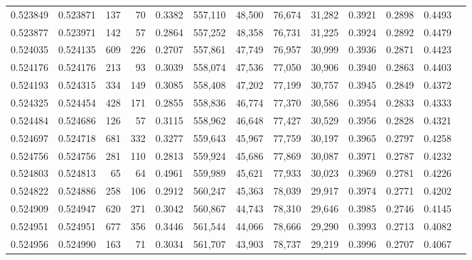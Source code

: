 \begin{tabular}{rrrrrrrrrrrrr}
0.523849 & 0.523871 &   137 &    70 &                                     0.3382 & 557,110 &  48,500 &  76,674 &  31,282 & 0.3921 & 0.2898 & 0.4493 \\
0.523877 & 0.523971 &   142 &    57 &                                     0.2864 & 557,252 &  48,358 &  76,731 &  31,225 & 0.3924 & 0.2892 & 0.4479 \\
0.524035 & 0.524135 &   609 &   226 &                                     0.2707 & 557,861 &  47,749 &  76,957 &  30,999 & 0.3936 & 0.2871 & 0.4423 \\
0.524176 & 0.524176 &   213 &    93 &                                     0.3039 & 558,074 &  47,536 &  77,050 &  30,906 & 0.3940 & 0.2863 & 0.4403 \\
0.524193 & 0.524315 &   334 &   149 &                                     0.3085 & 558,408 &  47,202 &  77,199 &  30,757 & 0.3945 & 0.2849 & 0.4372 \\
0.524325 & 0.524454 &   428 &   171 &                                     0.2855 & 558,836 &  46,774 &  77,370 &  30,586 & 0.3954 & 0.2833 & 0.4333 \\
0.524484 & 0.524686 &   126 &    57 &                                     0.3115 & 558,962 &  46,648 &  77,427 &  30,529 & 0.3956 & 0.2828 & 0.4321 \\
0.524697 & 0.524718 &   681 &   332 &                                     0.3277 & 559,643 &  45,967 &  77,759 &  30,197 & 0.3965 & 0.2797 & 0.4258 \\
0.524756 & 0.524756 &   281 &   110 &                                     0.2813 & 559,924 &  45,686 &  77,869 &  30,087 & 0.3971 & 0.2787 & 0.4232 \\
0.524803 & 0.524813 &    65 &    64 &                                     0.4961 & 559,989 &  45,621 &  77,933 &  30,023 & 0.3969 & 0.2781 & 0.4226 \\
0.524822 & 0.524886 &   258 &   106 &                                     0.2912 & 560,247 &  45,363 &  78,039 &  29,917 & 0.3974 & 0.2771 & 0.4202 \\
0.524909 & 0.524947 &   620 &   271 &                                     0.3042 & 560,867 &  44,743 &  78,310 &  29,646 & 0.3985 & 0.2746 & 0.4145 \\
0.524951 & 0.524951 &   677 &   356 &                                     0.3446 & 561,544 &  44,066 &  78,666 &  29,290 & 0.3993 & 0.2713 & 0.4082 \\
0.524956 & 0.524990 &   163 &    71 &                                     0.3034 & 561,707 &  43,903 &  78,737 &  29,219 & 0.3996 & 0.2707 & 0.4067 \\

\end{tabular}
